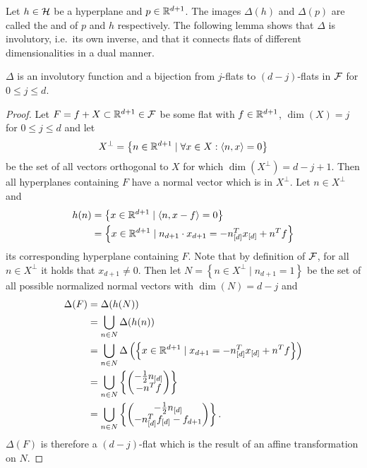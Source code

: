 Let $h \in \mathcal{H}$ be a hyperplane and $p \in \mathbb{R}^{d+1}$. The images $\Delta(h)$ and $\Delta(p)$ are called the  and  of $p$ and $h$ respectively.
The following lemma shows that $\Delta$ is involutory, i.e.~its own inverse, and that it connects flats of different dimensionalities in a dual manner.
\begin{lemma}
    \label{lem:deltainvolutory}
    $\Delta$ is an involutory function and a bijection from $j$-flats to $(d-j)$-flats in $\mathcal{F}$ for $0 \leq j \leq d$.
\end{lemma}
\begin{proof}
    Let $F = f + X \subset \mathbb{R}^{d+1} \in \mathcal{F}$ be some flat with $f \in \mathbb{R}^{d+1}$, $\dim(X) = j$ for $0 \leq j \leq d$ and let
    \begin{align}
        X^\bot = \left\{ n \in \mathbb{R}^{d+1} \mid \forall x \in X : \left\langle n, x \right\rangle = 0 \right\}
    \end{align}
    be the set of all vectors orthogonal to $X$ for which $\dim(X^\bot) = d - j + 1$.
    Then all hyperplanes containing $F$ have a normal vector which is in $X^\bot$.
    Let $n \in X^\bot$ and
    \begin{align}
        h(n) &= \left\{x \in \mathbb{R}^{d+1} \mid \left\langle n, x - f \right\rangle = 0\right\}\\
        &= \left\{ x \in \mathbb{R}^{d+1} \mid n_{d+1} \cdot x_{d+1} = -n_{[d]}^Tx_{[d]} + n^Tf \right\}
    \end{align}
    its corresponding hyperplane containing $F$.
    Note that by definition of $\mathcal{F}$, for all $n \in X^\bot$ it holds that $x_{d+1} \neq 0$.
    Then let $N = \left\{ n \in X^\bot \mid n_{d+1} = 1 \right\}$ be the set of all possible normalized normal vectors with $\dim(N) = d - j$ and
    \begin{align}
        \Delta(F) &= \Delta(h(N))\\
        &= \bigcup_{n \in N} \Delta(h(n)) \\
        &= \bigcup_{n \in N} \Delta \left( \left\{ x \in \mathbb{R}^{d+1} \mid x_{d+1} = -n_{[d]}^Tx_{[d]} + n^Tf \right\} \right) \\
        &= \bigcup_{n \in N} \left\{ \begin{pmatrix} -\frac{1}{2} n_{[d]}\\ - n^T f \end{pmatrix} \right\} \\
        &= \bigcup_{n \in N} \left\{ \begin{pmatrix} -\frac{1}{2} n_{[d]}\\ - n_{[d]}^T f_{[d]} - f_{d+1} \end{pmatrix} \right\}.
    \end{align}
    $\Delta(F)$ is therefore a $(d - j)$-flat which is the result of an affine transformation on $N$.


\end{proof}
